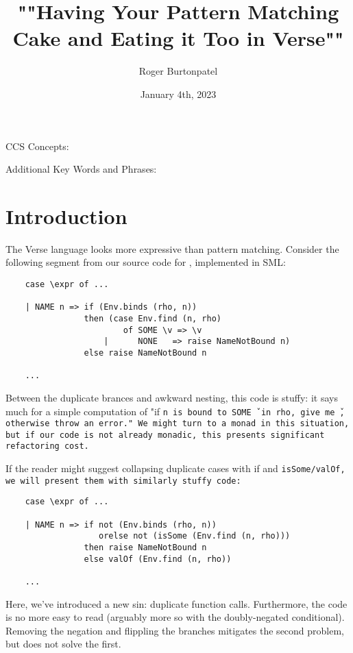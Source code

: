 \documentclass[]{article}
\title{""Having Your Pattern Matching Cake and Eating it Too in Verse""}
\author{Roger Burtonpatel}
\date{January 4th, 2023}
\begin{document}
\maketitle

CCS Concepts: 

\bigskip

Additional Key Words and Phrases: 

\bigskip

\section{Introduction}

The Verse language looks more expressive than pattern matching. 
Consider the following segment from our source code for {\VMinus}, implemented
in SML:

\smllst 

\begin{lstlisting}
    case \expr of ...

    | NAME n => if (Env.binds (rho, n))
                then (case Env.find (n, rho) 
                        of SOME \v => \v 
                    |      NONE   => raise NameNotBound n)
                else raise NameNotBound n 

    ...
\end{lstlisting}

Between the duplicate brances and awkward nesting, this code is stuffy: it says
much for a simple computation of "if \tt{n} is bound to \tt{SOME \v} in \tt{rho},
give me \tt{\v}, otherwise throw an error." We might turn to a monad in this
situation, but if our code is not already monadic, this presents significant
refactoring cost. 

\bigskip
If the reader might suggest collapsing duplicate cases with if and
\tt{isSome}/\tt{valOf}, we will present them with similarly stuffy code: 
\begin{lstlisting}
    case \expr of ...

    | NAME n => if not (Env.binds (rho, n))
                   orelse not (isSome (Env.find (n, rho)))
                then raise NameNotBound n 
                else valOf (Env.find (n, rho))

    ...
\end{lstlisting}

Here, we've introduced a new sin: duplicate function calls. Furthermore, the
code is no more easy to read (arguably more so with the doubly-negated
conditional). Removing the negation and flippling the branches mitigates the 
second problem, but does not solve the first. 
\end{document}
